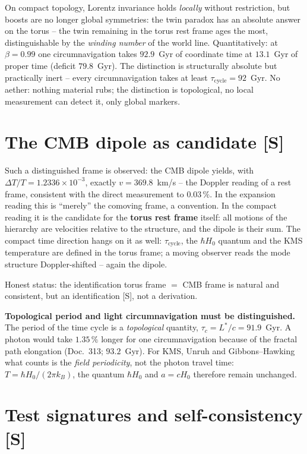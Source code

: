 \documentclass[11pt]{report}
\begin{document}
On compact topology, Lorentz invariance holds \emph{locally}
without restriction, but boosts are no longer global symmetries:
the twin paradox has an absolute answer on the torus -- the twin
remaining in the torus rest frame ages the most, distinguishable
by the \emph{winding number} of the world line. Quantitatively: at
$\beta = 0.99$ one circumnavigation takes $92.9$~Gyr of coordinate
time at $13.1$~Gyr of proper time (deficit $79.8$~Gyr). The
distinction is structurally absolute but practically inert --
every circumnavigation takes at least
$\tau_\text{cycle} = 92$~Gyr. No aether: nothing material rubs;
the distinction is topological, no local measurement can detect
it, only global markers.

\section{The CMB dipole as candidate [S]}

Such a distinguished frame is observed: the CMB dipole yields, with
$\Delta T/T = 1.2336\times10^{-3}$, exactly $v = 369.8$~km/s --
the Doppler reading of a rest frame, consistent with the direct
measurement to $0.03\,\%$. In the expansion reading this is
\enquote{merely} the comoving frame, a convention. In the compact
reading it is the candidate for the \textbf{torus rest frame}
itself: all motions of the hierarchy are velocities relative to
the structure, and the dipole is their sum. The compact time
direction hangs on it as well: $\tau_\text{cycle}$, the
$\hbar H_0$ quantum and the KMS temperature are defined in the
torus frame; a moving observer reads the mode structure
Doppler-shifted -- again the dipole.

Honest status: the identification torus frame $=$ CMB frame is
natural and consistent, but an identification [S], not a
derivation.

\textbf{Topological period and light circumnavigation must be
distinguished.} The period of the time cycle is a
\emph{topological} quantity, $\tau_c = L^{*}/c = 91.9$~Gyr. A
photon would take $1.35\,\%$ longer for one circumnavigation
because of the fractal path elongation (Doc.~313; $93.2$~Gyr).
For KMS, Unruh and Gibbons--Hawking what counts is the
\emph{field periodicity}, not the photon travel time:
$T = \hbar H_0/(2\pi k_B)$, the quantum $\hbar H_0$ and
$a = cH_0$ therefore remain unchanged.

\section{Test signatures and self-consistency [S]}
\end{document}
